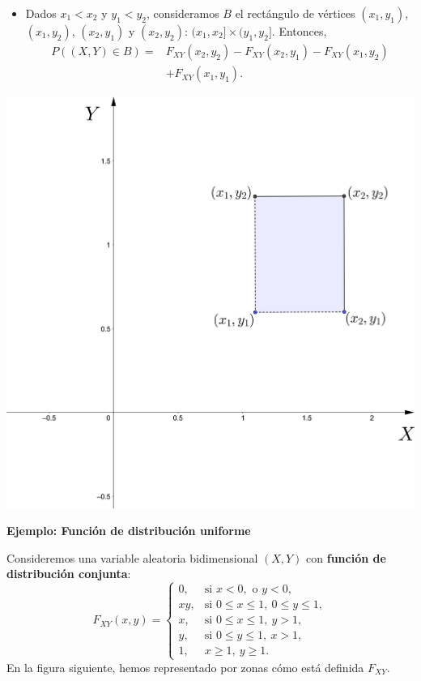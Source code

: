\documentclass[]{book}
\providecommand{\tightlist}{%
  \setlength{\itemsep}{0pt}\setlength{\parskip}{0pt}}
\begin{document}
\begin{itemize}
\tightlist
\item
  Dados \(x_1<x_2\) y \(y_1<y_2\), consideramos \(B\) el rectángulo de vértices \((x_1,y_1)\), \((x_1,y_2)\), \((x_2,y_1)\) y \((x_2,y_2)\): \((x_1,x_2]\times (y_1,y_2]\). Entonces,
  \[
  \begin{array}{rl}
  P((X,Y)\in B)  = & F_{XY}(x_2,y_2)-F_{XY}(x_2,y_1)-F_{XY}(x_1,y_2)\\ & +F_{XY}(x_1,y_1).
  \end{array}
  \]
\end{itemize}

\includegraphics{Images/Fxy3.png}

\textbf{Ejemplo: Función de distribución uniforme}

Consideremos una variable aleatoria bidimensional \((X,Y)\) con \textbf{función de distribución conjunta}:
\[
F_{XY}(x,y)=\begin{cases}
0, & \mbox{si }x<0,\mbox{ o }y<0,\\
xy, & \mbox{si }0\leq x\leq 1,\ 0\leq y\leq 1, \\
x, & \mbox{si }0\leq x\leq 1,\ y> 1, \\
y, & \mbox{si }0\leq y\leq 1,\ x> 1, \\
1, & x\geq 1,\ y\geq 1.
\end{cases}
\]
En la figura siguiente, hemos representado por zonas cómo está definida \(F_{XY}\).
\end{document}
